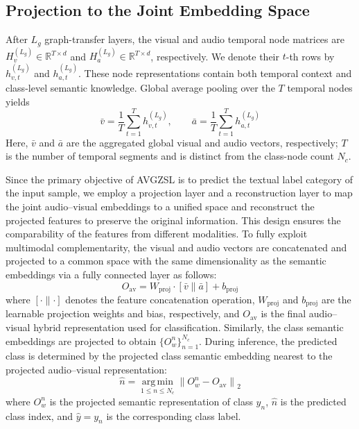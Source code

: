 \documentclass[10pt,journal,twoside]{IEEEtran}
\begin{document}
\subsection{Projection to the Joint Embedding Space}
After $L_g$ graph-transfer layers, the visual and audio temporal node matrices are $H_v^{(L_g)}\in\mathbb{R}^{T\times d}$ and $H_a^{(L_g)}\in\mathbb{R}^{T\times d}$, respectively. We denote their $t$-th rows by $h_{v,t}^{(L_g)}$ and $h_{a,t}^{(L_g)}$. These node representations contain both temporal context and class-level semantic knowledge. Global average pooling over the $T$ temporal nodes yields
\begin{equation}
\bar{v}=\frac{1}{T}\sum_{t=1}^{T}h_{v,t}^{(L_g)},\qquad
\bar{a}=\frac{1}{T}\sum_{t=1}^{T}h_{a,t}^{(L_g)}
\end{equation}
Here, $\bar{v}$ and $\bar{a}$ are the aggregated global visual and audio vectors, respectively; $T$ is the number of temporal segments and is distinct from the class-node count $N_c$.


Since the primary objective of AVGZSL is to predict the textual label category of the input sample, we employ a projection layer and a reconstruction layer to map the joint audio–visual embeddings to a unified space and reconstruct the projected features to preserve the original information. This design ensures the comparability of the features from different modalities. To fully exploit multimodal complementarity, the visual and audio vectors are concatenated and projected to a common space with the same dimensionality as the semantic embeddings via a fully connected layer as follows:
\begin{equation}
O_{\text{av}} = W_{\text{proj}} \cdot \left[ \bar{v} \parallel \bar{a} \right] + b_{\text{proj}}
\end{equation}
where $\left[ \cdot \parallel \cdot \right]$ denotes the feature concatenation operation, $W_{\text{proj}}$ and $b_{\text{proj}}$ are the learnable projection weights and bias, respectively, and $O_{\text{av}}$ is the final audio–visual hybrid representation used for classification. Similarly, the class semantic embeddings are projected to obtain $\{O_w^n\}_{n=1}^{N_c}$. During inference, the predicted class is determined by the projected class semantic embedding nearest to the projected audio--visual representation:
\begin{equation}
\widehat n=\operatorname*{arg\,min}_{1\le n\le N_c}\left\|O_w^n-O_{\text{av}}\right\|_2
\end{equation}
where $O_w^n$ is the projected semantic representation of class $y_n$, $\widehat n$ is the predicted class index, and $\widehat y=y_{\widehat n}$ is the corresponding class label.
\end{document}
